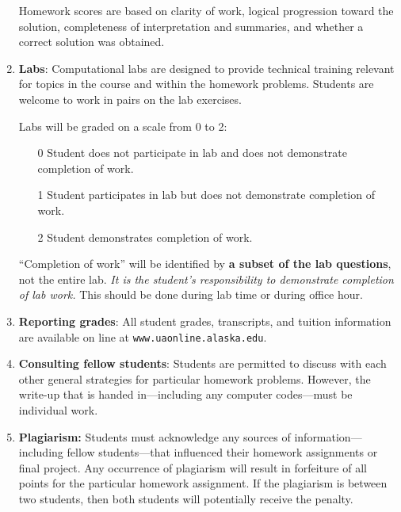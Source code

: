 \begin{enumerate}
Homework scores are based on clarity of work, logical progression toward the solution, completeness of interpretation and summaries, and whether a correct solution was obtained.


\item {\bf Labs}: Computational labs are designed to provide technical training relevant for topics in the course and within the homework problems. Students are welcome to work in pairs on the lab exercises.

Labs will be graded on a scale from 0 to 2:
%
\begin{itemize}
\item[0] Student does not participate in lab and does not demonstrate completion of work.
\item[1] Student participates in lab but does not demonstrate completion of work.
\item[2] Student demonstrates completion of work.
\end{itemize}
%
``Completion of work'' will be identified by {\bf a subset of the lab questions}, not the entire lab.
{\em It is the student's responsibility to demonstrate completion of lab work.} This should be done during lab time or during office hour.

\item {\bf Reporting grades}: All student grades, transcripts, and tuition information are available on line at \verb+www.uaonline.alaska.edu+. %

\item {\bf Consulting fellow students}: Students are permitted to discuss with each other general strategies for particular homework problems. However, the write-up that is handed in---including any computer codes---must be individual work.

\item {\bf Plagiarism:} Students must acknowledge any sources of information---including fellow students---that influenced their homework assignments or final project. Any occurrence of plagiarism will result in forfeiture of all points for the  particular homework assignment. If the plagiarism is between two students, then both students will potentially receive the penalty.


\end{enumerate}
